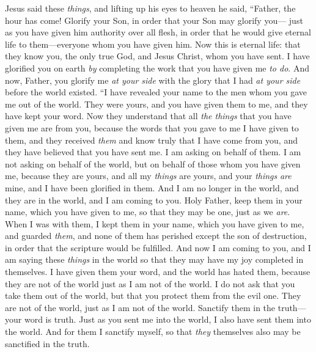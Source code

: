 \begin{biblechapter} %
 Jesus said these \textit{things}, and lifting up his eyes to heaven he said, “Father, the hour has come! Glorify your Son, in order that your Son may glorify you—
\verse just as you have given him authority over all flesh, in order that he would give eternal life to them—everyone whom you have given him.
\verse Now this is eternal life: that they know you, the only true God, and Jesus Christ, whom you have sent.
\verse I have glorified you on earth \textit{by} completing the work that you have given me \textit{to do}.
\verse And now, Father, you glorify me \textit{at your side} with the glory that I had \textit{at your side} before the world existed.
 “I have revealed your name to the men whom you gave me out of the world. They were yours, and you have given them to me, and they have kept your word.
\verse Now they understand that all \textit{the things} that you have given me are from you,
\verse because the words that you gave to me I have given to them, and they received \textit{them} and know truly that I have come from you, and they have believed that you have sent me.
\verse I am asking on behalf of them. I am not asking on behalf of the world, but on behalf of those whom you have given me, because they are yours,
\verse and all my \textit{things} are yours, and your \textit{things} \textit{are} mine, and I have been glorified in them.
\verse And I am no longer in the world, and they are in the world, and I am coming to you. Holy Father, keep them in your name, which you have given to me, so that they may be one, just as we \textit{are}.
\verse When I was with them, I kept them in your name, which you have given to me, and guarded \textit{them}, and none of them has perished except the son of destruction, in order that the scripture would be fulfilled.
\verse And now I am coming to you, and I am saying these \textit{things} in the world so that they may have my joy completed in themselves.
\verse I have given them your word, and the world has hated them, because they are not of the world just as I am not of the world.
\verse I do not ask that you take them out of the world, but that you protect them from the evil one.
\verse They are not of the world, just as I am not of the world.
\verse Sanctify them in the truth—your word is truth.
\verse Just as you sent me into the world, I also have sent them into the world.
\verse And for them I sanctify myself, so that \textit{they} themselves also may be sanctified in the truth.

\end{biblechapter}
